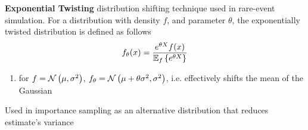 \documentclass[11pt]{article}
\begin{document}
\begin{defn*}
    \textbf{Exponential Twisting} distribution shifting technique used in rare-event simulation. For a distribution with density $f$, and parameter $\theta$, the exponentially twisted distribution is defined as follows
    \[
        f_{\theta}(x) = \frac{e^{\theta X} f(x)}{\E[f]{e^{\theta X}}}
    \]
    \begin{enumerate}
        \item for $f = \normal{\mu, \sigma^2}$, $f_{\theta} = \normal{\mu + \theta\sigma^2, \sigma^2}$, i.e. effectively shifts the mean of the Gaussian
    \end{enumerate}
    Used in importance sampling as an alternative distribution that reduces estimate's variance
\end{defn*}
\end{document}
